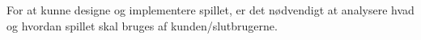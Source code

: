 For at kunne designe og implementere spillet, er det nødvendigt at analysere hvad og hvordan spillet skal bruges af kunden/slutbrugerne.

\newpage





